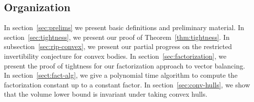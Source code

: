 \documentclass[11pt]{article}
\newcommand{\R}{{\mathbb{R}}}
\newcommand\eps{\varepsilon}
\newcommand{\eqdef}{\triangleq}
\DeclareMathOperator{\disc}{disc}
\DeclareMathOperator{\hd}{hd}
\DeclareMathOperator{\vb}{vb}
\begin{document}
\subsection{Organization}

In section~\ref{sec:prelims} we present basic definitions and preliminary
material. In section~\ref{sec:tightness}, we present our proof of
Theorem~\ref{thm:tightness}. In subsection~\ref{sec:rip-convex}, we present our
partial progress on the restricted invertibility conjecture for convex bodies.
In section~\ref{sec:factorization}, we present the proof of tightness for our
factorization approach to vector balancing. In section~\ref{sect:fact-alg}, we
give a polynomial time algorithm to compute the factorization constant up to a
constant factor. In section~\ref{sec:conv-hulls}, we show that the volume lower
bound is invariant under taking convex hulls.  

% 
\end{document}
